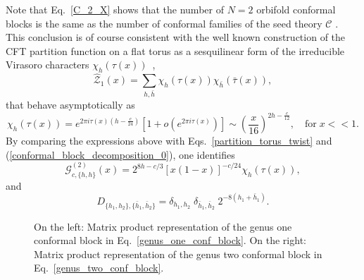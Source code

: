 \documentclass[a4paper,11pt]{article}
\begin{document}
Note that Eq.~\eqref{C_2_X} shows that the number of $N=2$ orbifold conformal blocks is the same as the number
of conformal families of the seed theory $\mathcal{C}$ . This conclusion is of course consistent with
the well known construction of the CFT partition function on a flat torus as a sesquilinear form of the
irreducible Virasoro characters $\chi_{h}(\tau(x))$~\cite{Cappelli, Cappelli2},
\begin{equation}
\mathcal{\hat{Z}}_1(x) = \sum_{h,\bar{h}} \chi_{h}(\tau(x)) \chi_{\bar{h}}(\bar{\tau}(x)),
\end{equation}
that behave asymptotically as
\begin{equation}
\chi_{h}(\tau(x)) = e^{2\pi i \tau(x)\left(h-\frac{c}{24}\right)}\left[1+ o\left(e^{2\pi i \tau(x)}\right)\right] \sim \left(\frac{x}{16}\right)^{ 2 h-\frac{c}{12}}, \quad \text{for}\; x<<1.
\end{equation}
 By comparing the expressions above with Eqs.~\eqref{partition_torus_twist} and (\ref{conformal_block_decomposition_0}), one identifies 
\begin{equation}\label{character_conf_block}
\mathcal{G}_{c,\{h, h\}}^{(2)}(x)=2^{8h-c/3}[x(1-x)]^{-c/24}\chi_{h}(\tau(x)),
\end{equation}
and 
\begin{equation}
 D_{\{ h_1, h_2 \}, \{ \bar{h}_1,\bar{h}_2\} } =\delta_{h_1,h_2}\;\delta_{\bar{h}_1,\bar{h}_2} \;2^{-8 (h_1+\bar{h}_1)}.
\end{equation}


\begin{figure}[t]
\centering
\caption{On the left: Matrix product representation of the genus one conformal block in Eq.~\eqref{genus_one_conf_block}. On the right: Matrix product representation of the genus two conformal block in Eq.~\eqref{genus_two_conf_block}.}
\label{fig-g1}
\end{figure}
\end{document}
